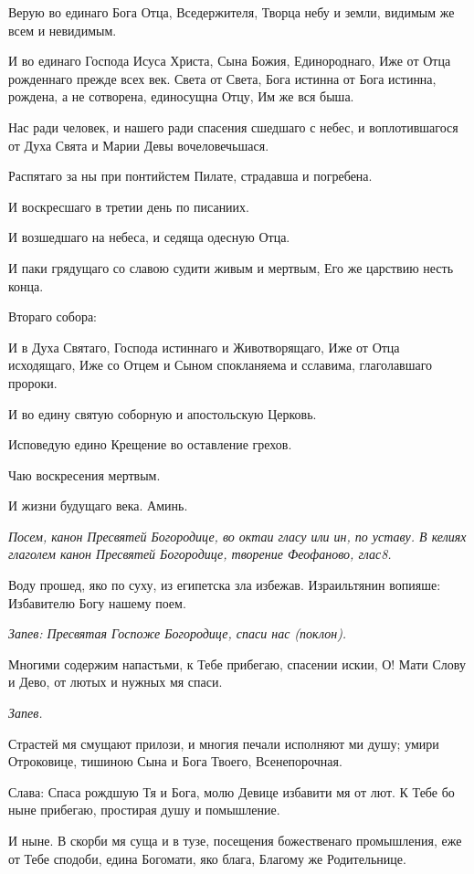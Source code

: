 Верую во единаго Бога Отца, Вседержителя, Творца небу и земли, видимым же всем и невидимым.

И во единаго Господа Исуса Христа, Сына  Божия, Единороднаго, Иже от Отца рожденнаго прежде всех век. Света от Света, Бога истинна от Бога истинна, рождена, а не сотворена, единосущна Отцу, Им же вся быша.

Нас ради человек, и нашего ради спасения сшедшаго с небес, и воплотившагося от Духа Свята и Марии Девы вочеловечьшася.

Распятаго за ны при понтийстем Пилате, страдавша и погребена.

И воскресшаго в третии день по писаниих.

И возшедшаго на небеса, и седяща одесную Отца.

И паки грядущаго со славою судити живым и мертвым, Его же царствию несть конца.

Втораго собора:

И в Духа Святаго, Господа истиннаго и Животворящаго, Иже от Отца исходящаго, Иже со Отцем и Сыном спокланяема  и сславима, глаголавшаго пророки.

И во едину святую соборную и апостольскую Церковь.

Исповедую едино Крещение во оставление грехов.

Чаю воскресения мертвым.

И жизни будущаго века. Аминь.


\itshape Посем, канон Пресвятей Богородице, во октаи гласу или ин, по уставу. В  келиях глаголем канон Пресвятей Богородице, творение Феофаново, глас8. \normalfont{}




Воду прошед, яко по суху, из египетска зла избежав. Израильтянин вопияше: Избавителю Богу нашему поем.


\itshape Запев:\normalfont{} Пресвятая Госпоже Богородице, спаси нас (поклон).

Многими содержим напастьми, к Тебе прибегаю, спасении искии, О! Мати Слову и Дево, от лютых и нужных мя спаси.


\itshape Запев.\normalfont{}


Страстей мя смущают прилози, и многия печали исполняют ми душу; умири Отроковице, тишиною Сына и Бога Твоего, Всенепорочная.


Слава: Спаса рождшую Тя и Бога, молю Девице избавити мя от лют. К Тебе бо ныне прибегаю, простирая душу и помышление.

И ныне. В скорби мя суща и в тузе, посещения божественаго промышления, еже от Тебе сподоби, едина Богомати, яко блага, Благому же Родительнице.


